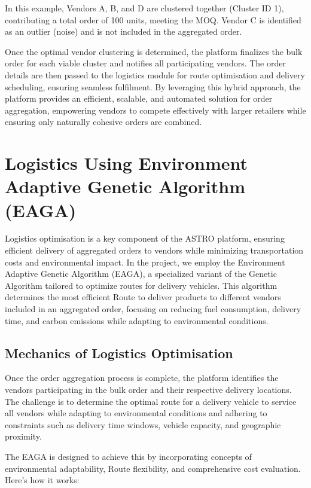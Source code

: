 In this example, Vendors A, B, and D are clustered together (Cluster ID 1), contributing a total order of 100 units, meeting the MOQ. Vendor C is identified as an outlier (noise) and is not included in the aggregated order.

Once the optimal vendor clustering is determined, the platform finalizes the bulk order for each viable cluster and notifies all participating vendors. The order details are then passed to the logistics module for route optimisation and delivery scheduling, ensuring seamless fulfilment. By leveraging this hybrid approach, the platform provides an efficient, scalable, and automated solution for order aggregation, empowering vendors to compete effectively with larger retailers while ensuring only naturally cohesive orders are combined.


\section{Logistics Using Environment Adaptive Genetic Algorithm (EAGA)}

Logistics optimisation is a key component of the ASTRO platform, ensuring efficient delivery of aggregated orders to vendors while minimizing transportation costs and environmental impact. In the project, we employ the Environment Adaptive Genetic Algorithm (EAGA), a specialized variant of the Genetic Algorithm\cite{baker2003genetic} tailored to optimize routes for delivery vehicles. This algorithm determines the most efficient Route to deliver products to different vendors included in an aggregated order, focusing on reducing fuel consumption, delivery time, and carbon emissions while adapting to environmental conditions.

\subsection{Mechanics of Logistics Optimisation}

Once the order aggregation process is complete, the platform identifies the vendors participating in the bulk order and their respective delivery locations. The challenge is to determine the optimal route for a delivery vehicle to service all vendors while adapting to environmental conditions and adhering to constraints such as delivery time windows, vehicle capacity, and geographic proximity.

The EAGA is designed to achieve this by incorporating concepts of environmental adaptability, Route flexibility, and comprehensive cost evaluation. Here's how it works:

